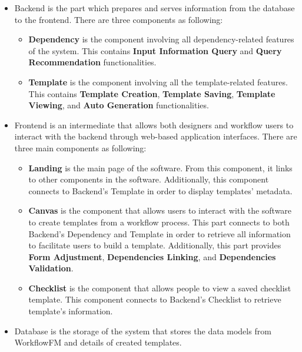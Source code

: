 \begin{itemize}
    \item Backend is the part which prepares and serves information from the database to the frontend. There are three components as following:
    \begin{itemize}
        \item \textbf{Dependency} is the component involving all dependency-related features of the system. This contains \textbf{Input Information Query} and \textbf{Query Recommendation} functionalities.
        \item \textbf{Template} is the component involving all the template-related features. This contains \textbf{Template Creation}, \textbf{Template Saving}, \textbf{Template Viewing}, and  \textbf{Auto Generation} functionalities.
    \end{itemize}
    \item Frontend is an intermediate that allows both designers and workflow users to interact with the backend through web-based application interfaces. There are three main components as following:
    \begin{itemize}
        \item \textbf{Landing} is the main page of the software. From this component, it links to other components in the software. Additionally, this component connects to Backend's Template in order to display templates' metadata.
        \item \textbf{Canvas} is the component that allows users to interact with the software to create templates from a workflow process. This part connects to both Backend's Dependency and Template in order to retrieve all information to facilitate users to build a template.
        Additionally, this part provides \textbf{Form Adjustment}, \textbf{Dependencies Linking}, and \textbf{Dependencies Validation}.
        \item \textbf{Checklist} is the component that allows people to view a saved checklist template. This component connects to Backend's Checklist to retrieve template's information.
    \end{itemize}
    \item Database is the storage of the system that stores the data models from WorkflowFM and details of created templates.
\end{itemize}

